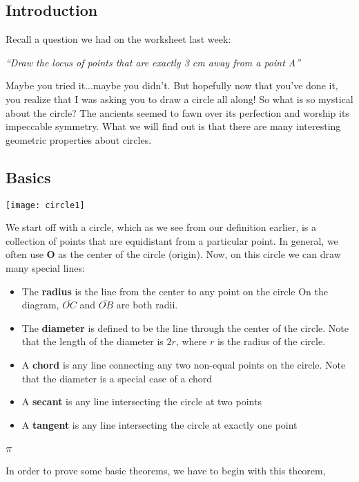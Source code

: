 \subsection{Introduction}
Recall a question we had on the worksheet last week:
\begin{center}
\textit{``Draw the locus of points that are exactly 3 cm away from a point A''}
\end{center}

Maybe you tried it...maybe you didn't. But hopefully now that you've done it, you realize that I was asking you to draw a circle all along! So what is so mystical about the circle? The ancients seemed to fawn over its perfection and worship its impeccable symmetry. What we will find out is that there are many interesting geometric properties about circles.

\subsection{Basics}
\begin{center}
\texttt{[image: circle1]}
\end{center}
We start off with a circle, which as we see from our definition earlier, is a collection of points that are equidistant from a particular point. In general, we often use \textbf{O} as the center of the circle (origin). Now, on this circle we can draw many special lines:
\begin{itemize}
    \item The \textbf{radius} is the line from the center to any point on the circle On the diagram, $\overline{OC}$ and $\overline{OB}$ are both radii. 
    \item The \textbf{diameter} is defined to be the line through the center of the circle. Note that the length of the diameter is $2r$, where $r$ is the radius of the circle.
    \item A \textbf{chord} is any line connecting any two non-equal points on the circle. Note that the diameter is a special case of a chord
    \item A \textbf{secant} is any line intersecting the circle at two points
    \item A \textbf{tangent} is any line intersecting the circle at exactly one point
\end{itemize}

\subsubsection{$\pi$}
In order to prove some basic theorems, we have to begin with this theorem,

